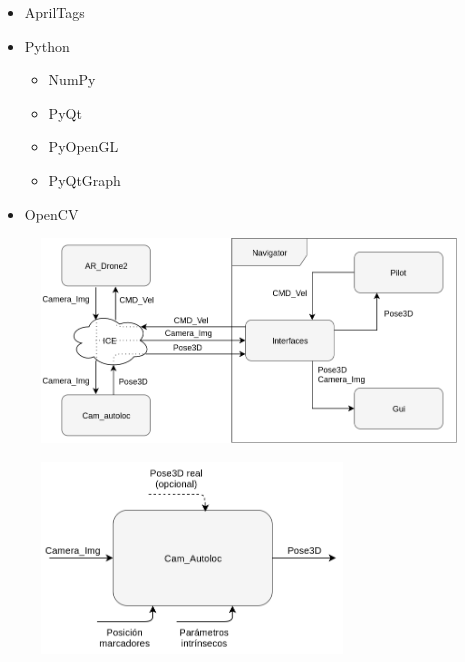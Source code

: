 \documentclass[notes,slidesec,a4]{seminar}
\begin{document}
\begin{hslide}

\begin{itemize}
\item AprilTags
\item Python
	\begin{itemize}
	\item NumPy
	\item PyQt
	\item PyOpenGL
	\item PyQtGraph
	\end{itemize}
\item OpenCV
\end{itemize}

\end{hslide}



\begin{hslide}

\begin{center}
	\begin{figure}
		\includegraphics[width=11cm]{img/interactuacionproj2}
	\end{figure}
\end{center}

\end{hslide}



\begin{hslide}

\begin{center}
	\begin{figure}
		\centering
		\includegraphics[width=8cm]{img/cam_autoloccaja}
	\end{figure}
\end{center}

\end{hslide}
\end{document}
